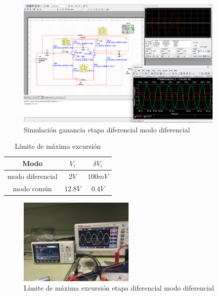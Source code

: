 \begin{figure}[ht]
    \centering
    \includegraphics[width=0.9\textwidth]{src/images/p2/ganancia-etapa-diff-modo-diff.png}
    \caption{Simulación ganancia etapa diferencial modo diferencial}
    \label{fig:sim-etapa-diferencial-ganancia-modo-diferencial}
\end{figure}


\begin{table}[ht]
    \centering
    \begin{tabular}{|c|c|c|}
        \hline
        Modo & $V_i$ & $\delta V_i$ \\
        \hline
        modo diferencial & $2V$ & $100mV$ \\
        \hline
        modo común & $12.8V$ & $0.4V$ \\
        \hline
    \end{tabular}
    \caption{Límite de máxima excursión}
\end{table}


\begin{figure}[ht]
    \centering
    \includegraphics[width=0.5\textwidth]{src/images/p2/limite-excursion-diferencial.jpg}
    \caption{Límite de máxima excursión etapa diferencial modo diferencial}
\end{figure}

